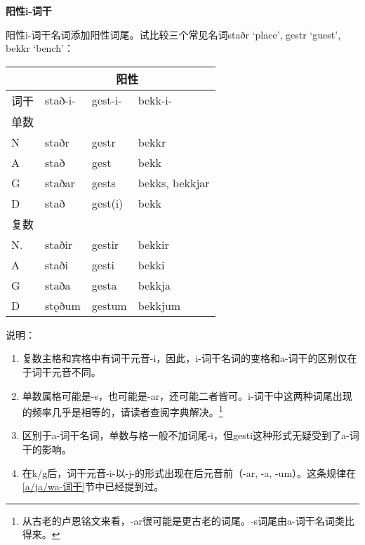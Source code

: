\textbf{阳性i-词干}

阳性i-词干名词添加阳性词尾。试比较三个常见名词staðr `place', gestr
`guest', bekkr `bench'：

\begin{longtable}{llll}
  \toprule
       & \multicolumn{3}{c}{阳性}                            \\
  \midrule
  \endhead
  \bottomrule
  \endfoot
  词干 & stað-i-                  & gest-i- & bekk-i-        \\
  单数 &                          &         &                \\
  N    & staðr                    & gestr   & bekkr          \\
  A    & stað                     & gest    & bekk           \\
  G    & staðar                   & gests   & bekks, bekkjar \\
  D    & stað                     & gest(i) & bekk           \\
  复数 &                          &         &                \\
  N.   & staðir                   & gestir  & bekkir         \\
  A    & staði                    & gesti   & bekki          \\
  G    & staða                    & gesta   & bekkja         \\
  D    & stǫðum                   & gestum  & bekkjum        \\
\end{longtable}

说明：

\begin{enumerate}
  \def\labelenumi{\arabic{enumi})}
  \item
        复数主格和宾格中有词干元音-i，因此，i-词干名词的变格和a-词干的区别仅在于词干元音不同。
  \item
        单数属格可能是-s，也可能是-ar，还可能二者皆可。i-词干中这两种词尾出现的频率几乎是相等的，请读者查阅字典解决。\footnote{从古老的卢恩铭文来看，-ar很可能是更古老的词尾。-s词尾由a-词干名词类比得来。}
  \item
        区别于a-词干名词，单数与格一般不加词尾-i，但gesti这种形式无疑受到了a-词干的影响。
  \item
        在k/g后，词干元音-i-以-j-的形式出现在后元音前（-ar, -a,
        -um）。这条规律在\ref{a/ja/wa-词干}节中已经提到过。
\end{enumerate}

